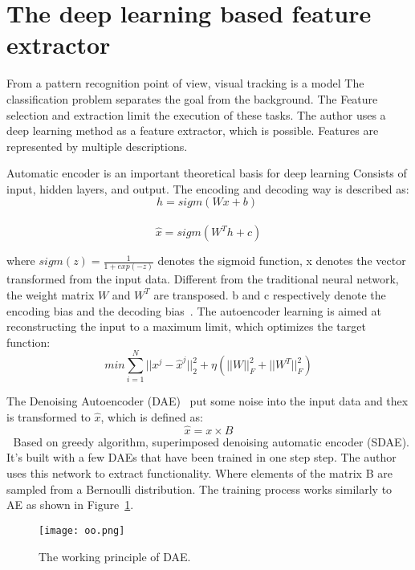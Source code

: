 \documentclass[10pt,twocolumn,letterpaper]{article}
\begin{document}
\section{The deep learning based feature extractor}
From a pattern recognition point of view, visual tracking is a model
The classification problem separates the goal from the background. The
Feature selection and extraction limit the execution of these tasks.
The author uses a deep learning method as a feature extractor, which is possible. Features are represented by multiple descriptions.


Automatic encoder is an important theoretical basis for deep learning
Consists of input, hidden layers, and output. The encoding and decoding
way is described as:
\begin{equation}
 h=sigm(Wx+b)
\end{equation} 	
\begin{equation}
\widehat{x}=sigm(W^Th+c)
\end{equation}

where $sigm(z)=\frac{1}{1+exp(-z)}$ denotes	the	sigmoid function, x
denotes the vector transformed from the input data. Different from the
traditional neural network, the weight matrix $W$ and $W^T$ are transposed. b
and c respectively denote the encoding bias and the decoding bias~\cite{krizhevsky2012imagenet}.
The autoencoder learning is aimed at reconstructing the input to a
maximum limit, which optimizes the target function:
\begin{equation}
min\sum_{i=1}^N||x^j-\widehat{x}^j||_{2}^2+η\left(
||W||_{F}^2+||W^T||_{F}^2  \right)
\end{equation}


The Denoising Autoencoder (DAE)~\cite{Ahmed2015An} put some noise into the input data
and thex is transformed to $\widehat{x}$, which is defined as:
\begin{equation}
\widehat{x}= x\times B
\end{equation}
Based on greedy algorithm, superimposed denoising automatic encoder (SDAE).
It's built with a few DAEs that have been trained in one step
step. The author uses this network to extract functionality. Where elements of the matrix B are sampled from a Bernoulli
distribution. The training process works similarly to AE as shown in
Figure~\ref{fig:1}.
\begin{figure}[htb]
\begin{center}
\texttt{[image: oo.png]}
\end{center}
\caption{ The working principle of DAE.}
\label{fig:1}
\end{figure}



{\small


}
\end{document}
